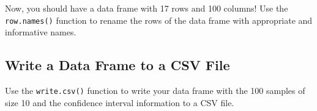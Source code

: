 \documentclass{article}
\begin{document}
\item Now, you should have a data frame with 17 rows and 100 columns!  
Use the \texttt{row.names()} function to rename the rows of the data frame with appropriate and informative names.

\subsection{Write a Data Frame to a CSV File}
Use the \texttt{write.csv()} function to write your data frame with the 100 samples of size 10 and the confidence interval information to a CSV file.
\end{document}
